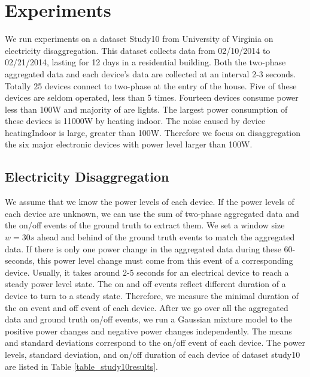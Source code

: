\section{Experiments}
We run experiments on a dataset Study10 from University of Virginia on electricity disaggregation. 
This dataset collects data from 02/10/2014 to 02/21/2014, lasting for 12 days in a residential building. 
Both the two-phase aggregated data and each device's data are collected at an interval 2-3 seconds.
Totally 25 devices connect to two-phase at the entry of the house. 
Five of these devices are seldom operated, less than 5 times. 
Fourteen devices consume power less than 100W and majority of are lights. 
The largest power consumption of these devices is 11000W by heating indoor. 
The noise caused by device heatingIndoor is large, greater than 100W. 
Therefore we focus on disaggregation the six major electronic devices 
with power level larger than 100W. 
 
%

\subsection{Electricity Disaggregation}
We assume that we know the power levels of each device. 
If the power levels of each device are unknown, 
we can use the sum of two-phase aggregated data and the on/off events of the 
ground truth to extract them. 
We set a window size $w=30s$ ahead and behind of the ground truth events to match 
the aggregated data.
If there is only one power change in the aggregated data during these 60-seconds, 
this power level change must come from this event of a corresponding device. 
Usually, it takes around 2-5 seconds for an electrical device to reach
a steady power level state. 
The on and off events reflect different duration of a device to 
turn to a steady state. 
Therefore, we measure the minimal duration of the on event and off event 
of each device. 
After we go over all the aggregated data and ground truth on/off events, 
we run a Gaussian mixture model to the positive power changes and negative power changes
independently. The means and standard deviations correspond to  the on/off event of each device. 
The power levels, standard deviation, and on/off duration of each device of dataset study10 are listed in Table \ref{table_study10results}.


